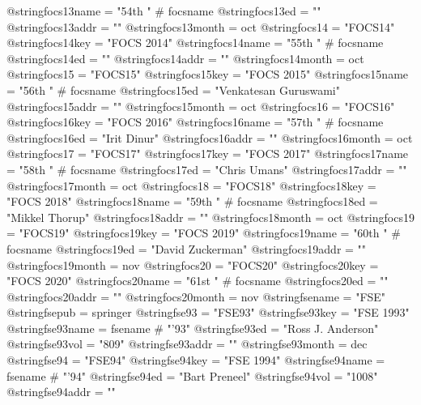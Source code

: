 @string{focs13name =            "54th " # focsname}
@string{focs13ed =              ""}
@string{focs13addr =            ""}
@string{focs13month =           oct}
@string{focs14 =                "FOCS14"}
@string{focs14key =             "FOCS 2014"}
@string{focs14name =            "55th " # focsname}
@string{focs14ed =              ""}
@string{focs14addr =            ""}
@string{focs14month =           oct}
@string{focs15 =                "FOCS15"}
@string{focs15key =             "FOCS 2015"}
@string{focs15name =            "56th " # focsname}
@string{focs15ed =              "Venkatesan Guruswami"}
@string{focs15addr =            ""}
@string{focs15month =           oct}
@string{focs16 =                "FOCS16"}
@string{focs16key =             "FOCS 2016"}
@string{focs16name =            "57th " # focsname}
@string{focs16ed =              "Irit Dinur"}
@string{focs16addr =            ""}
@string{focs16month =           oct}
@string{focs17 =                "FOCS17"}
@string{focs17key =             "FOCS 2017"}
@string{focs17name =            "58th " # focsname}
@string{focs17ed =              "Chris Umans"}
@string{focs17addr =            ""}
@string{focs17month =           oct}
@string{focs18 =                "FOCS18"}
@string{focs18key =             "FOCS 2018"}
@string{focs18name =            "59th " # focsname}
@string{focs18ed =              "Mikkel Thorup"}
@string{focs18addr =            ""}
@string{focs18month =           oct}
@string{focs19 =                "FOCS19"}
@string{focs19key =             "FOCS 2019"}
@string{focs19name =            "60th " # focsname}
@string{focs19ed =              "David Zuckerman"}
@string{focs19addr =            ""}
@string{focs19month =           nov}
@string{focs20 =                "FOCS20"}
@string{focs20key =             "FOCS 2020"}
@string{focs20name =            "61st " # focsname}
@string{focs20ed =              ""}
@string{focs20addr =            ""}
@string{focs20month =           nov}
@string{fsename =               "FSE"}
@string{fsepub =                springer}
@string{fse93 =                 "FSE93"}
@string{fse93key =              "FSE 1993"}
@string{fse93name =             fsename # "'93"}
@string{fse93ed =               "Ross J. Anderson"}
@string{fse93vol =              "809"}
@string{fse93addr =             ""}
@string{fse93month =            dec}
@string{fse94 =                 "FSE94"}
@string{fse94key =              "FSE 1994"}
@string{fse94name =             fsename # "'94"}
@string{fse94ed =               "Bart Preneel"}
@string{fse94vol =              "1008"}
@string{fse94addr =             ""}
